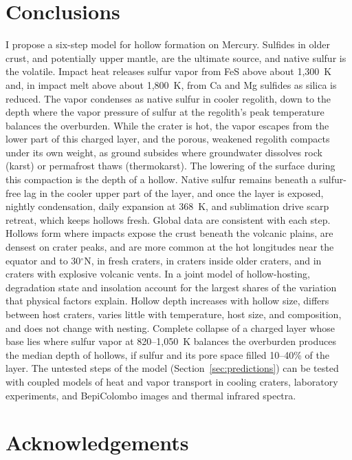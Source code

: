 \documentclass[article,review]{planetary}
\begin{document}
\FloatBarrier
\section{Conclusions}
\label{sec:conclusions}
I propose a six-step model for hollow formation on Mercury. Sulfides in older crust, and potentially upper mantle, are the ultimate source, and native sulfur is the volatile. Impact heat releases sulfur vapor from FeS above about 1,300~K and, in impact melt above about 1,800~K, from Ca and Mg sulfides as silica is reduced. The vapor condenses as native sulfur in cooler regolith, down to the depth where the vapor pressure of sulfur at the regolith's peak temperature balances the overburden. While the crater is hot, the vapor escapes from the lower part of this charged layer, and the porous, weakened regolith compacts under its own weight, as ground subsides where groundwater dissolves rock (karst) or permafrost thaws (thermokarst). The lowering of the surface during this compaction is the depth of a hollow. Native sulfur remains beneath a sulfur-free lag in the cooler upper part of the layer, and once the layer is exposed, nightly condensation, daily expansion at 368~K, and sublimation drive scarp retreat, which keeps hollows fresh. Global data are consistent with each step. Hollows form where impacts expose the crust beneath the volcanic plains, are densest on crater peaks, and are more common at the hot longitudes near the equator and to 30$^\circ$N, in fresh craters, in craters inside older craters, and in craters with explosive volcanic vents. In a joint model of hollow-hosting, degradation state and insolation account for the largest shares of the variation that physical factors explain. Hollow depth increases with hollow size, differs between host craters, varies little with temperature, host size, and composition, and does not change with nesting. Complete collapse of a charged layer whose base lies where sulfur vapor at 820--1,050~K balances the overburden produces the median depth of hollows, if sulfur and its pore space filled 10--40\% of the layer. The untested steps of the model (Section~\ref{sec:predictions}) can be tested with coupled models of heat and vapor transport in cooling craters, laboratory experiments, and BepiColombo images and thermal infrared spectra.

\section*{Acknowledgements}
\end{document}
